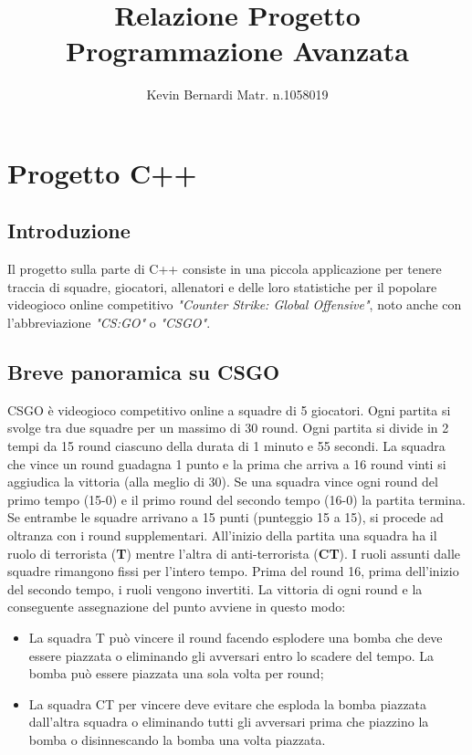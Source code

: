 \documentclass[a4paper, 11pt]{article}
\title{Relazione Progetto Programmazione Avanzata}
\author{Kevin Bernardi Matr. n.1058019}
\date{}
\begin{document}
\maketitle
\section{Progetto C++}
\subsection{Introduzione}
Il progetto sulla parte di C++ consiste in una piccola applicazione per tenere traccia di squadre, giocatori, allenatori e delle loro statistiche per il popolare videogioco online competitivo \textit{"Counter Strike: Global Offensive"}, noto anche con l'abbreviazione \textit{"CS:GO"} o \textit{"CSGO"}.

\subsection{Breve panoramica su CSGO}
CSGO è videogioco competitivo online a squadre di 5 giocatori. Ogni partita si svolge tra due squadre per un massimo di 30 round. 
Ogni partita si divide in 2 tempi da 15 round ciascuno della durata di 1 minuto e 55 secondi.
La squadra che vince un round guadagna 1 punto e la prima che arriva a 16 round vinti si aggiudica la vittoria (alla meglio di 30). Se una squadra vince ogni round del primo tempo (15-0) e il primo round del secondo tempo (16-0) la partita termina. Se entrambe le squadre arrivano a 15 punti (punteggio 15 a 15), si procede ad oltranza con i round supplementari.
All'inizio della partita una squadra ha il ruolo di terrorista (\textbf{T}) mentre l'altra di anti-terrorista (\textbf{CT}). I ruoli assunti dalle squadre rimangono fissi per l'intero tempo. Prima del round 16, prima dell'inizio del secondo tempo, i ruoli vengono invertiti.
La vittoria di ogni round e la conseguente assegnazione del punto avviene in questo modo:
\begin{itemize}
\item La squadra T può vincere il round facendo esplodere una bomba che deve essere piazzata o eliminando gli avversari entro lo scadere del tempo. La bomba può essere piazzata una sola volta per round;

\item La squadra CT per vincere deve evitare che esploda la bomba piazzata dall'altra squadra o eliminando tutti gli avversari prima che piazzino la bomba o disinnescando la bomba una volta piazzata.
\end{itemize}
\end{document}
